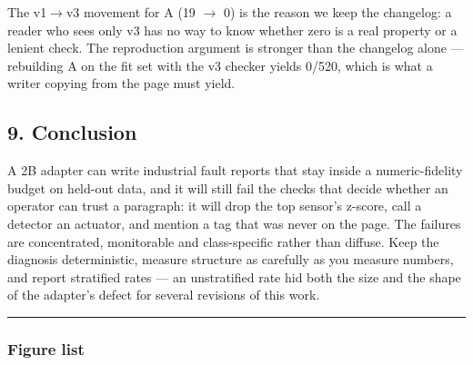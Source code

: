 \documentclass[
  10pt,
]{article}
\begin{document}
The v1$\rightarrow$v3 movement for A (19 $\rightarrow$ 0) is the reason we keep the changelog: a
reader who sees only v3 has no way to know whether zero is a real
property or a lenient check. The reproduction argument is stronger than
the changelog alone --- rebuilding A on the fit set with the v3 checker
yields 0/520, which is what a writer copying from the page must yield.

\subsection{9. Conclusion}\label{conclusion}

A 2B adapter can write industrial fault reports that stay inside a
numeric-fidelity budget on held-out data, and it will still fail the
checks that decide whether an operator can trust a paragraph: it will
drop the top sensor's z-score, call a detector an actuator, and mention
a tag that was never on the page. The failures are concentrated,
monitorable and class-specific rather than diffuse. Keep the diagnosis
deterministic, measure structure as carefully as you measure numbers,
and report stratified rates --- an unstratified rate hid both the size
and the shape of the adapter's defect for several revisions of this
work.

\begin{center}\rule{0.5\linewidth}{0.5pt}\end{center}

\subsubsection{Figure list}\label{figure-list}
\end{document}
